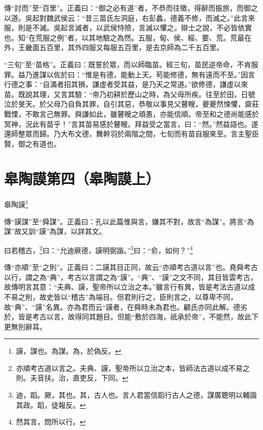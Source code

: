 {\noindent\zhuan{}\fzbyks 傳“討而”至“百里”。正義曰：“御之必有道”者，不恭而往徵，得辭而振旅，而御之以道。吳起對魏武侯云：“昔三苗氏左洞庭，右彭蠡，德義不修，而滅之。”此言來服，則是不滅。吳起言滅者，以武侯恃險，言滅以懼之。辯士之說，不必皆依實也。知“在荒服之例”者，以其地驗之為然。五服，甸、侯、綏、要、荒。荒最在外，王畿面五百里，其外四服又每服五百里，是去京師為二千五百里。 \par}

{\noindent\shu{}\fzkt “三旬”至“苗格”。正義曰：既誓於眾，而以師臨苗。經三旬，苗民逆帝命，不肯服罪。益乃進謀以佐於曰：“惟是有德，能動上天。苟能修德，無有遠而不至。”因言行德之事：“自滿者招其損，謙虛者受其益，是乃天之常道。”欲修德，謙虛以來苗。既說其理，又言其驗：“帝乃初耕於歷山之時，為父母所疾。往至於田，日號泣於旻天。於父母乃自負其罪，自引其惡，恭敬以事見父瞽瞍，夔夔然悚懼，齋莊戰慄，不敢言己無罪。舜謙如此，雖瞽瞍之頑愚，亦能信順。帝至和之德尚能感於冥神，況此有苗乎！”言其苗易感於瞽瞍。拜益受之當言，曰：“然。”然益語也。遂還師整眾而歸。乃大布文德，舞幹羽於兩階之間，七旬而有苗自服來至。言主聖臣賢，御之有道也。 \par}

\section{皋陶謨第四（皋陶謨上）}


皋陶謨\footnote{謨，謀也。為謀。為，於偽反。}

{\noindent\zhuan{}\fzbyks 傳“謨謀”至“舜謀”。正義曰：孔以此篇惟與言，嫌其不對，故言“為謀”。將言“為謀”故又訓“謨”為謀，以詳其文。 \par}

曰若稽古，\footnote{亦順考古道以言之。夫典、謨，聖帝所以立治之本，皆師法古道以成不易之則。夫音扶。治，直吏反，下同。}曰：“允迪厥德，謨明弼諧。”\footnote{迪，蹈。厥，其也。其，古人也。言人君當信蹈行古人之德，謀廣聰明以輔諧其政。蹈，徒報反。}曰：“俞，如何？”\footnote{然其言，問所以行。}

{\noindent\zhuan{}\fzbyks 傳“亦順”至“之則”。正義曰：二謨其目正同，故云“亦順考古道以言”也。堯舜考古以行，謂之為“典”，考古以言謂之為“謨”。“典”、“謨”之文不同，其目皆雲考古，故傳明言其意：“夫典、謨，聖帝所以立治之本。”雖言行有異，皆是考法古道以成不易之則，故史皆以“稽古”為端目。但君則行之，臣則言之，以尊卑不同，故“典”、“謨”名異。亦為君而云“謨者，在舜時未為君也。顧氏亦同此解。德劣於，皆是考古以言，故得同其題目。但能“敷於四海，祇承於帝”，不能然，故此下更無別辭耳。 \par}

